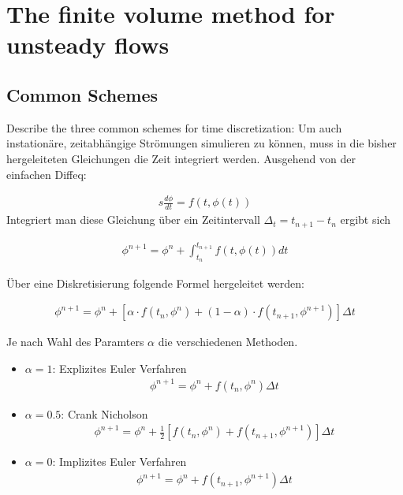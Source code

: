 \documentclass[a4paper]{scrartcl}
\begin{document}


\section{The finite volume method for unsteady flows}
\subsection{Common Schemes} Describe the three common schemes for time
discretization:
Um auch instationäre, zeitabhängige Strömungen simulieren zu können, muss in die
bisher hergeleiteten Gleichungen die Zeit integriert werden. Ausgehend von der
einfachen Diffeq:

\begin{align}s
\frac{d\phi}{dt}=f(t,\phi(t))
\end{align}
Integriert man diese Gleichung über ein Zeitintervall $\Delta_t = t_{n+1}-t_n$
ergibt sich

\begin{align}
\phi^{n+1}=\phi^n + \int_{t_n}^{t_{n+1}} f(t,\phi(t))dt
\end{align}
 
Über eine Diskretisierung folgende Formel hergeleitet werden:

\begin{align}
\phi^{n+1}=\phi^n + \left[\alpha \cdot f(t_n,\phi^n)+(1-\alpha)\cdot
f(t_{n+1},\phi^{n+1})\right]\Delta t
\end{align}


Je nach Wahl des Paramters $\alpha$ die verschiedenen Methoden. \\
\begin{itemize}
  \item $\alpha = 1$: Explizites Euler Verfahren \begin{align}
  \phi^{n+1}= \phi^n + f(t_n,\phi^n) \Delta t
  \end{align}
  \item $\alpha= 0.5$: Crank Nicholson \begin{align}
  \phi^{n+1}=\phi^n + \frac{1}{2}
  \left[f(t_n,\phi^n)+f(t_{n+1},\phi^{n+1})\right]\Delta t
  \end{align}
  \item $\alpha = 0$: Implizites Euler Verfahren \begin{align}
  \phi^{n+1}=\phi^n + f(t_{n+1},\phi^{n+1})\Delta t
  \end{align}
\end{itemize}
\end{document}
